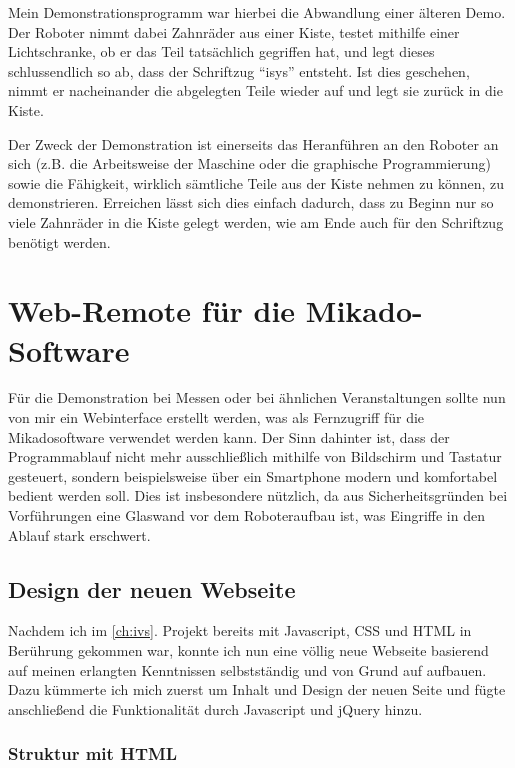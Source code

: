 Mein Demonstrationsprogramm war hierbei die Abwandlung einer älteren Demo. Der Roboter
nimmt dabei Zahnräder aus einer Kiste, testet mithilfe einer Lichtschranke, ob er
das Teil tatsächlich gegriffen hat, und legt dieses schlussendlich so ab, dass der
Schriftzug ``isys'' entsteht. Ist dies geschehen, nimmt er nacheinander die abgelegten
Teile wieder auf und legt sie zurück in die Kiste.

Der Zweck der Demonstration ist einerseits das Heranführen an den Roboter an sich
(z.B. die Arbeitsweise der Maschine oder die graphische Programmierung) sowie die
Fähigkeit, wirklich sämtliche Teile aus der Kiste nehmen zu können, zu demonstrieren.
Erreichen lässt sich dies einfach dadurch, dass zu Beginn nur so viele Zahnräder
in die Kiste gelegt werden, wie am Ende auch für den Schriftzug benötigt werden.



\section{Web-Remote für die Mikado-Software}

Für die Demonstration bei Messen oder bei ähnlichen Veranstaltungen sollte nun von
mir ein Webinterface erstellt werden, was als Fernzugriff für die Mikadosoftware
verwendet werden kann. Der Sinn dahinter ist, dass der Programmablauf nicht mehr
ausschließlich mithilfe von Bildschirm und Tastatur gesteuert, sondern beispielsweise
über ein Smartphone modern und komfortabel bedient werden soll. Dies ist insbesondere
nützlich, da aus Sicherheitsgründen bei Vorführungen eine Glaswand vor dem Roboteraufbau
ist, was Eingriffe in den Ablauf stark erschwert.


\subsection{Design der neuen Webseite}

Nachdem ich im \ref{ch:ivs}. Projekt bereits mit Javascript, CSS und HTML in Berührung
gekommen war, konnte ich nun eine völlig neue Webseite basierend auf meinen erlangten
Kenntnissen selbstständig und von Grund auf aufbauen. Dazu kümmerte ich mich zuerst
um Inhalt und Design der neuen Seite und fügte anschließend die Funktionalität durch
Javascript und jQuery hinzu.

\subsubsection{Struktur mit HTML}

